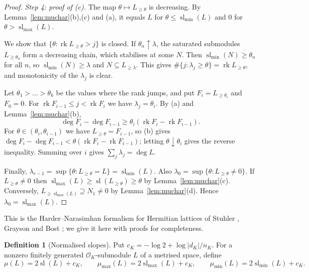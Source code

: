 \documentclass[10pt]{amsart}
\theoremstyle{definition}
\newtheorem{definition}[theorem]{Definition}
\theoremstyle{remark}
\begin{document}
\begin{proof}
\emph{Step 4: proof of (c).} The map $\theta\mapsto L_{\ge\theta}$ is decreasing. By Lemma~\ref{lem:muchar}(b),(c) and (a), it equals $L$ for $\theta\le\operatorname{sl}_{\min}(L)$ and $0$ for $\theta>\operatorname{sl}_{\max}(L)$.

We show that $\{\theta:\operatorname{rk}L_{\ge\theta}>j\}$ is closed. If $\theta_n\uparrow\lambda$, the saturated submodules $L_{\ge\theta_n}$ form a decreasing chain, which stabilises at some $N$. Then $\operatorname{sl}_{\min}(N)\ge\theta_n$ for all $n$, so $\operatorname{sl}_{\min}(N)\ge\lambda$ and $N\subseteq L_{\ge\lambda}$. This gives $\#\{j:\lambda_j\ge\theta\}=\operatorname{rk}L_{\ge\theta}$, and monotonicity of the $\lambda_j$ is clear.

Let $\theta_1>\dots>\theta_k$ be the values where the rank jumps, and put $F_i=L_{\ge\theta_i}$ and $F_0=0$. For $\operatorname{rk}F_{i-1}\le j<\operatorname{rk}F_i$ we have $\lambda_j=\theta_i$. By (a) and Lemma~\ref{lem:muchar}(b),
\[
\deg F_i-\deg F_{i-1}\ge\theta_i(\operatorname{rk}F_i-\operatorname{rk}F_{i-1}).
\]
For $\theta\in(\theta_i,\theta_{i-1})$ we have $L_{\ge\theta}=F_{i-1}$, so (b) gives $\deg F_i-\deg F_{i-1}<\theta(\operatorname{rk}F_i-\operatorname{rk}F_{i-1})$; letting $\theta\downarrow\theta_i$ gives the reverse inequality. Summing over $i$ gives $\sum_j\lambda_j=\deg L$.

Finally, $\lambda_{r-1}=\sup\{\theta:L_{\ge\theta}=L\}=\operatorname{sl}_{\min}(L)$. Also $\lambda_0=\sup\{\theta:L_{\ge\theta}\ne0\}$. If $L_{\ge\theta}\neq0$ then $\operatorname{sl}_{\max}(L)\ge\operatorname{sl}(L_{\ge\theta})\ge\theta$ by Lemma~\ref{lem:muchar}(c). Conversely, $L_{\ge\operatorname{sl}_{\max}(L)}\supseteq N_1\neq0$ by Lemma~\ref{lem:muchar}(d). Hence $\lambda_0=\operatorname{sl}_{\max}(L)$.
\end{proof}

This is the Harder--Narasimhan formalism for Hermitian lattices of
Stuhler \cite{Stuhler1976}, Grayson \cite{Grayson1984} and Bost \cite{Bost1996}; we give it here with proofs for
completeness.

\begin{definition}[Normalised slopes]\label{def:normslope}
Put $c_K=-\log2+\log|d_K|/n_K$. For a nonzero finitely generated $\mathcal O_K$-submodule $L$ of a metrised space, define
\[
\mu(L)=2\operatorname{sl}(L)+c_K,\qquad\mu_{\max}(L)=2\operatorname{sl}_{\max}(L)+c_K,\qquad\mu_{\min}(L)=2\operatorname{sl}_{\min}(L)+c_K .
\]
\end{definition}
\end{document}
